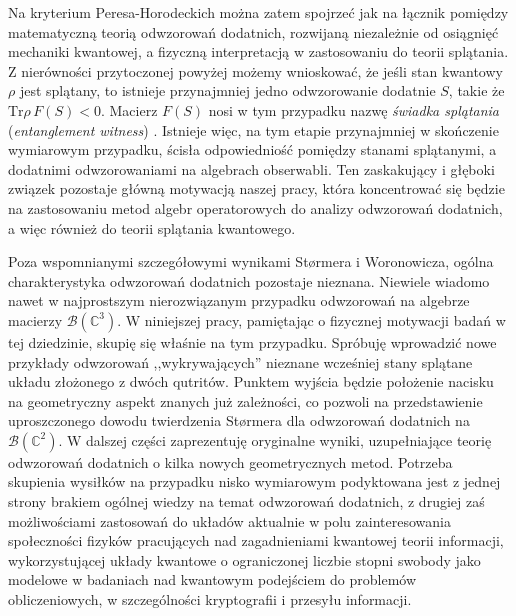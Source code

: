 Na kryterium Peresa-Horodeckich można zatem spojrzeć jak na łącznik pomiędzy
matematyczną teorią odwzorowań dodatnich,
rozwijaną niezależnie od osiągnięć mechaniki kwantowej,
a fizyczną interpretacją w zastosowaniu do teorii splątania.
Z nierówności przytoczonej powyżej %
możemy wnioskować,
że jeśli stan kwantowy $\rho$ jest splątany,
to istnieje przynajmniej jedno odwzorowanie dodatnie $S$,
takie że $\text{Tr} \rho \, F(S) < 0$.
Macierz $F(S)$ nosi w tym przypadku nazwę
\emph{świadka splątania} (\emph{entanglement witness})
\cite{bourennane2004experimental}.
Istnieje więc,
na tym etapie przynajmniej w skończenie wymiarowym przypadku,
ścisła odpowiedniość pomiędzy stanami splątanymi,
a dodatnimi odwzorowaniami na algebrach obserwabli.
Ten zaskakujący i głęboki związek pozostaje główną motywacją naszej pracy,
która koncentrować się będzie na zastosowaniu metod algebr operatorowych
do analizy odwzorowań dodatnich,
a więc również do teorii splątania kwantowego.

Poza wspomnianymi szczegółowymi wynikami St{\o}rmera i Woronowicza,
ogólna charakterystyka odwzorowań dodatnich pozostaje nieznana.
Niewiele wiadomo nawet w najprostszym nierozwiązanym przypadku odwzorowań
na algebrze macierzy $\mathcal{B}(\mathbb{C}^{3})$.
W niniejszej pracy,
pamiętając o fizycznej motywacji badań w tej dziedzinie,
skupię się właśnie na tym przypadku.
Spróbuję wprowadzić nowe przykłady odwzorowań
,,wykrywających'' nieznane wcześniej stany splątane układu złożonego
z dwóch qutritów.
Punktem wyjścia będzie położenie nacisku na geometryczny aspekt znanych
już zależności,
co pozwoli na przedstawienie uproszczonego dowodu twierdzenia St{\o}rmera
dla odwzorowań dodatnich na $\mathcal{B}(\mathbb{C}^{2})$.
W dalszej części zaprezentuję oryginalne wyniki,
uzupełniające teorię odwzorowań dodatnich o kilka nowych geometrycznych metod.
Potrzeba skupienia wysiłków na przypadku nisko wymiarowym podyktowana jest
z jednej strony brakiem ogólnej wiedzy na temat odwzorowań dodatnich,
z drugiej zaś możliwościami zastosowań do układów aktualnie w polu zainteresowania
społeczności fizyków pracujących nad zagadnieniami kwantowej teorii informacji,
wykorzystującej układy kwantowe o ograniczonej liczbie stopni swobody
jako modelowe w badaniach nad kwantowym podejściem do problemów obliczeniowych,
w szczególności kryptografii i przesyłu informacji.


